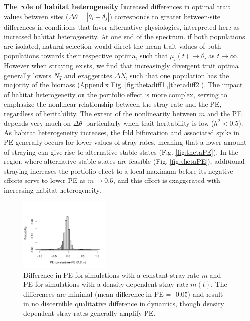 \documentclass[twocolumn,preprintnumbers,amsmath,amssymb,superscriptaddress]{revtex4}
\begin{document}
{\bf The role of habitat heterogeneity} Increased differences in optimal trait values between sites ($\Delta\theta = \left|\theta_i - \theta_j\right|$) corresponds to greater between-site differences in conditions that favor alternative physiologies, interpreted here as increased habitat heterogeneity.
At one end of the spectrum, if both populations are isolated, natural selection would direct the mean trait values of both populations towards their respective optima, such that $\mu_i(t) \rightarrow \theta_i$ as $t\rightarrow\infty$.
However when straying exists, we find that increasingly divergent trait optima generally lowers $N_T$ and exaggerates $\Delta N$, such that one population has the majority of the biomass (Appendix Fig. \ref{fig:thetadiff1},\ref{thetadiff2}).
The impact of habitat heterogeneity on the portfolio effect is more complex, serving to emphasize the nonlinear relationship between the stray rate and the PE, regardless of heritability.
The extent of the nonlinearity between $m$ and the PE depends very much on $\Delta\theta$, particularly when trait heritability is low ($h^2<0.5$).
As habitat heterogeneity increases, the fold bifurcation and associated spike in PE generally occurs for lower values of stray rates, meaning that a lower amount of straying can give rise to alternative stable states (Fig. \ref{fig:thetaPE}).
In the region where alternative stable states are feasible (Fig. \ref{fig:thetaPE}), additional straying increases the portfolio effect to a local maximum before its negative effects serve to lower PE as $m\rightarrow 0.5$, and this effect is exaggerated with increasing habitat heterogeneity.



\begin{figure}
\centering
\includegraphics[width=0.4\textwidth]{figs/fig_diffddm.pdf}
\caption{
Difference in PE for simulations with a constant stray rate $m$ and PE for simulations with a density dependent stray rate $m(t)$. The differences are minimal (mean difference in PE = -0.05) and result in no discernible qualitative difference in dynamics, though density dependent stray rates generally amplify PE.
} \label{fig:diffddm}
\end{figure}
\end{document}
